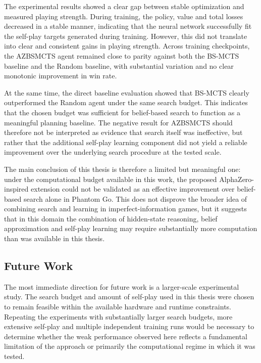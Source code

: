 \documentclass[12pt,oneside,openright]{article}
\begin{document}
The experimental results showed a clear gap between stable optimization and measured playing strength. During training, the policy, value and total losses decreased in a stable manner, indicating that the neural network successfully fit the self-play targets generated during training. However, this did not translate into clear and consistent gains in playing strength. Across training checkpoints, the AZBSMCTS agent remained close to parity against both the BS-MCTS baseline and the Random baseline, with substantial variation and no clear monotonic improvement in win rate.

At the same time, the direct baseline evaluation showed that BS-MCTS clearly outperformed the Random agent under the same search budget. This indicates that the chosen budget was sufficient for belief-based search to function as a meaningful planning baseline. The negative result for AZBSMCTS should therefore not be interpreted as evidence that search itself was ineffective, but rather that the additional self-play learning component did not yield a reliable improvement over the underlying search procedure at the tested scale.

The main conclusion of this thesis is therefore a limited but meaningful one: under the computational budget available in this work, the proposed AlphaZero-inspired extension could not be validated as an effective improvement over belief-based search alone in Phantom Go. This does not disprove the broader idea of combining search and learning in imperfect-information games, but it suggests that in this domain the combination of hidden-state reasoning, belief approximation and self-play learning  may require substantially more computation than was available in this thesis.

\subsection{Future Work}

The most immediate direction for future work is a larger-scale experimental study. The search budget and amount of self-play used in this thesis were chosen to remain feasible within the available hardware and runtime constraints. Repeating the experiments with substantially larger search budgets, more extensive self-play and multiple independent training runs would be necessary to determine whether the weak performance observed here reflects a fundamental limitation of the approach or primarily the computational regime in which it was tested.
\end{document}
